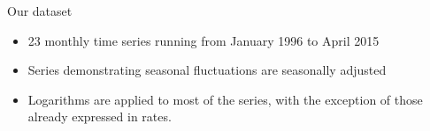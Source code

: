 \documentclass{beamer} %
\newcommand{\prior}{\underline}
\begin{document}
%


%

\begin{frame}{Our dataset}%
\begin{itemize}
\item 23 monthly time series running from January 1996 to April 2015 
\item Series demonstrating seasonal fluctuations are seasonally adjusted 
\item Logarithms are applied to most of the series, with the exception of those already expressed in rates.
\end{itemize}
\end{frame}
\end{document}
